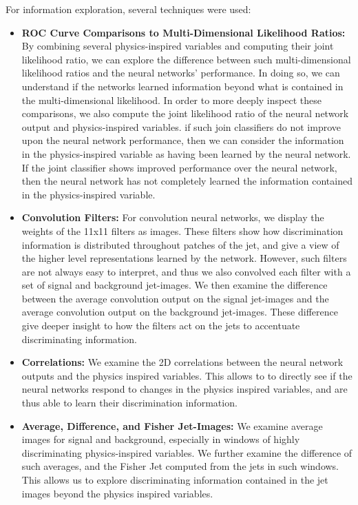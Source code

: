 For information exploration, several techniques were used:
\begin{itemize}

\item \textbf{ROC Curve Comparisons to Multi-Dimensional Likelihood Ratios:}  By combining several physics-inspired variables and computing their joint likelihood ratio, we can explore the difference between such multi-dimensional likelihood ratios and the neural networks' performance.  In doing so, we can understand if the networks learned information beyond what is contained in the multi-dimensional likelihood.  In order to more deeply inspect these comparisons, we also compute the joint likelihood ratio of the neural network output and physics-inspired variables.  if such join classifiers do not improve upon the neural network performance, then we can consider the information in the physics-inspired variable as having been learned by the neural network.  If the joint classifier shows improved performance over the neural network, then the neural network has not completely learned the information contained in the physics-inspired variable.

\item \textbf{Convolution Filters:}  For convolution neural networks, we display the weights of the 11x11 filters as images.  These filters show how discrimination information is distributed throughout patches of the jet, and give a view of the higher level representations learned by the network.  However, such filters are not always easy to interpret, and thus we also convolved each filter with a set of signal and background jet-images.  We then examine the difference between the average convolution output on the signal jet-images and the average convolution output on the background jet-images.  These difference give deeper insight to how the filters act on the jets to accentuate discriminating information.

\item \textbf{Correlations:}  We examine the 2D correlations between the neural network outputs and the physics inspired variables.  This allows to to directly see if the neural networks respond to changes in the physics inspired variables, and are thus able to learn their discrimination information.

\item \textbf{Average, Difference, and Fisher Jet-Images:}  We examine average images for signal and background, especially in windows of highly discriminating physics-inspired variables.  We further examine the difference of such averages, and the Fisher Jet computed from the jets in such windows.  This allows us to explore discriminating information contained in the jet images beyond the physics inspired variables.


\end{itemize}
